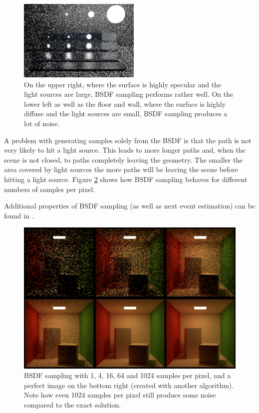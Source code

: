  \begin{figure}[ht]
 \centering
 \includegraphics[width=0.52\textwidth]{bilder/veach/bsdf_64.png}
 \caption{On the upper right, where the surface is highly specular and the light sources are large, BSDF sampling performs rather well.\newline
On the lower left as well as the floor and wall, where the surface is highly diffuse and the light sources are small, BSDF sampling produces a lot of noise.}
  \label{BSDF_veach}\end{figure}



A problem with generating samples solely from the BSDF is that the path is not very likely to hit a light source. This leads to more longer paths and, when the scene is not closed, to paths completely leaving the geometry. The smaller the area covered by light sources the more paths will be leaving the scene before hitting a light source. Figure \ref{BSDFsampling_spp} shows how BSDF sampling behaves for different numbers of samples per pixel.
 
 Additional properties of BSDF sampling (as well as next event estimation) can be found in \cite{veachdiss}.


 \begin{figure}[ht!]
 \centering
 \includegraphics[width=1\textwidth]{bilder/bsdf_sampling/1-4-16-64-1024-mts.png}
 \caption{BSDF sampling with 1, 4, 16, 64 and 1024 samples per pixel, and a perfect image on the bottom right (created with another algorithm).\newline
Note how even 1024 samples per pixel still produce some noise compared to the exact solution.}
  \label{BSDFsampling_spp}\end{figure}


